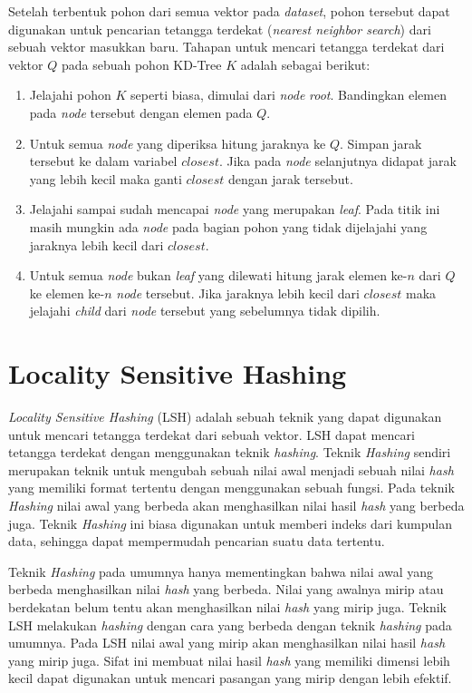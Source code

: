 Setelah terbentuk pohon dari semua vektor pada \textit{dataset}, pohon tersebut dapat digunakan untuk pencarian tetangga terdekat (\textit{nearest neighbor search}) dari sebuah vektor masukkan baru. Tahapan untuk mencari tetangga terdekat dari vektor $Q$ pada sebuah pohon KD-Tree $K$ adalah sebagai berikut:
\begin{enumerate}
	\item Jelajahi pohon $K$ seperti biasa, dimulai dari \textit{node} \textit{root}. Bandingkan elemen pada \textit{node} tersebut dengan elemen pada $Q$. 
	\item Untuk semua \textit{node} yang diperiksa hitung jaraknya ke $Q$. Simpan jarak tersebut ke dalam variabel $closest$. Jika pada \textit{node} selanjutnya didapat jarak yang lebih kecil maka ganti $closest$ dengan jarak tersebut.
	\item Jelajahi sampai sudah mencapai \textit{node} yang merupakan \textit{leaf}. Pada titik ini masih mungkin ada \textit{node} pada bagian pohon yang tidak dijelajahi yang jaraknya lebih kecil dari $closest$.
	\item Untuk semua \textit{node} bukan \textit{leaf} yang dilewati hitung jarak elemen ke-$n$ dari $Q$ ke elemen ke-$n$ \textit{node} tersebut. Jika jaraknya lebih kecil dari $closest$ maka jelajahi \textit{child} dari \textit{node} tersebut yang sebelumnya tidak dipilih.
\end{enumerate}

\section{Locality Sensitive Hashing}
\textit{Locality Sensitive Hashing} (LSH) adalah sebuah teknik yang dapat digunakan untuk mencari tetangga terdekat dari sebuah vektor. LSH dapat mencari tetangga terdekat dengan menggunakan teknik \textit{hashing}. Teknik \textit{Hashing} sendiri merupakan teknik untuk mengubah sebuah nilai awal menjadi sebuah nilai \textit{hash} yang memiliki format tertentu dengan menggunakan sebuah fungsi. Pada teknik \textit{Hashing} nilai awal yang berbeda akan menghasilkan nilai hasil \textit{hash} yang berbeda juga. Teknik \textit{Hashing} ini biasa digunakan untuk memberi indeks dari kumpulan data, sehingga dapat mempermudah pencarian suatu data tertentu.

Teknik \textit{Hashing} pada umumnya hanya mementingkan bahwa nilai awal yang berbeda menghasilkan nilai \textit{hash} yang berbeda. Nilai yang awalnya mirip atau berdekatan belum tentu akan menghasilkan nilai \textit{hash} yang mirip juga. Teknik LSH melakukan \textit{hashing} dengan cara yang berbeda dengan teknik \textit{hashing} pada umumnya. Pada LSH nilai awal yang mirip akan menghasilkan nilai hasil \textit{hash} yang mirip juga. Sifat ini membuat nilai hasil \textit{hash} yang memiliki dimensi lebih kecil dapat digunakan untuk mencari pasangan yang mirip dengan lebih efektif.

